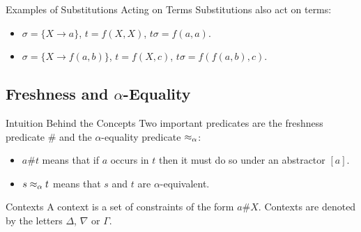 \begin{frame}{Examples of Substitutions Acting on Terms}
    Substitutions also act on terms: 
    \begin{itemize}
        \item $\sigma = \{X \rightarrow a\}$, $t = f(X, X)$, $t\sigma = f(a, a)$.
        \item $\sigma = \{X \rightarrow f(a, b)\}$, $t = f(X, c)$, $t\sigma = f(f(a, b), c)$.
    \end{itemize}
\end{frame}

\subsection{Freshness and $\alpha$-Equality}

\begin{frame}{Intuition Behind the Concepts}
    Two important predicates are the freshness predicate $\#$ and the $\alpha$-equality
    predicate $\mathrel{\approx_\alpha}$: 
    \begin{itemize}
        \item $a\#t$ means that if $a$ occurs in $t$ then it must do so
            under an abstractor $[a]$. 
        \item $s \mathrel{\approx_\alpha} t$ means that $s$ and $t$ are $\alpha$-equivalent.
    \end{itemize}
\end{frame}

\begin{frame}{Contexts}
    A context is a set of constraints of the form $a\#X$. Contexts are denoted by the letters
    $\Delta$, $\nabla$ or $\Gamma$.
\end{frame}


